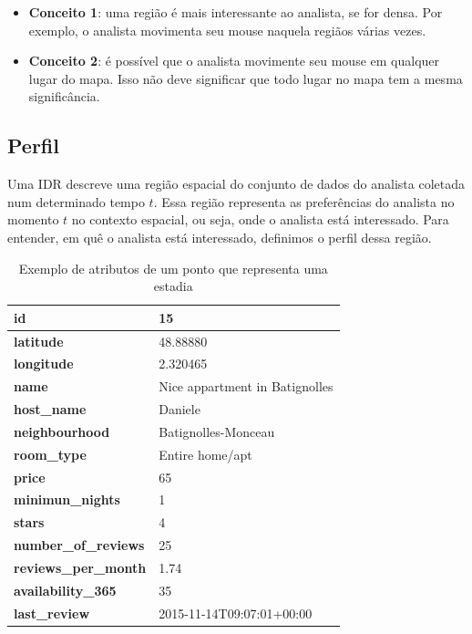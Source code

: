 \begin{itemize}
	\item \textbf{Conceito 1}: uma região é mais interessante ao analista, se for densa. Por exemplo, o analista movimenta seu mouse naquela regiãos várias vezes.
	\item \textbf{Conceito 2}: é possível que o analista movimente seu mouse em qualquer lugar do mapa. Isso não deve significar que todo lugar no mapa tem a mesma significância.
\end{itemize}


\subsection{Perfil}

Uma IDR descreve uma região espacial do conjunto de dados do analista coletada num determinado tempo $t$. Essa região representa as preferências do analista no momento $t$ no contexto espacial, ou seja, onde o analista está interessado. Para entender, em quê o analista está interessado, definimos o perfil dessa região.

\begin{table}[]
	\centering
	\begin{tabular}{|l|l|}
		\hline
		\textbf{id}                  & 15                             \\ \hline
		\textbf{latitude}            & 48.88880                       \\ \hline
		\textbf{longitude}           & 2.320465                       \\ \hline
		\textbf{name}                & Nice appartment in Batignolles \\ \hline
		\textbf{host\_name}          & Daniele                        \\ \hline
		\textbf{neighbourhood}       & Batignolles-Monceau            \\ \hline
		\textbf{room\_type}          & Entire home/apt                \\ \hline
		\textbf{price}               & 65                             \\ \hline
		\textbf{minimun\_nights}     & 1                              \\ \hline
		\textbf{stars}               & 4                              \\ \hline
		\textbf{number\_of\_reviews} & 25                             \\ \hline
		\textbf{reviews\_per\_month} & 1.74                           \\ \hline
		\textbf{availability\_365}   & 35                             \\ \hline
		\textbf{last\_review}        & 2015-11-14T09:07:01+00:00      \\ \hline
	\end{tabular}
	\caption{Exemplo de atributos de um ponto que representa uma estadia}
	\label{table:atributos}
\end{table}

